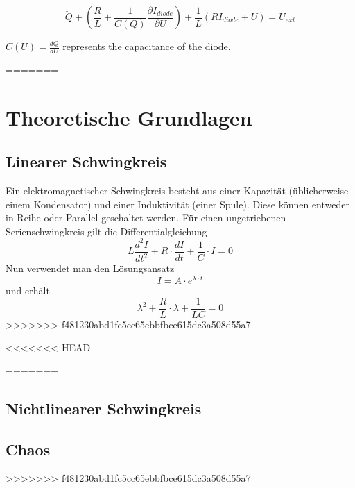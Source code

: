 \begin{equation} 
\ddot Q + \left(\frac{R}{L} + \frac{1}{C(Q)} \frac{\partial I_{diode}}{\partial U}\right) + \frac{1}{L}(RI_{diode}+U)=U_{ext} \end{equation}

$C(U) = \frac{dQ}{dU}$ represents the capacitance of the diode.


=======
\section{Theoretische Grundlagen}

\subsection{Linearer Schwingkreis}
Ein elektromagnetischer Schwingkreis besteht aus einer Kapazität (üblicherweise einem Kondensator) und einer Induktivität (einer Spule). Diese können entweder in Reihe oder Parallel geschaltet werden. Für einen ungetriebenen Serienschwingkreis gilt die Differentialgleichung
\begin{equation}
 L \frac{d^2 I}{d t^2} + R \cdot \frac{d I}{d t} + \frac{1}{C} \cdot I = 0
\end{equation}
Nun verwendet man den Lösungsansatz
\begin{equation}
 I = A \cdot e^{\lambda \cdot t}
\end{equation}
und erhält
\begin{equation}
 \lambda^2 + \frac{R}{L} \cdot \lambda + \frac{1}{LC} = 0
\end{equation}
>>>>>>> f481230abd1fc5cc65ebbfbce615dc3a508d55a7





<<<<<<< HEAD

=======
\subsection{Nichtlinearer Schwingkreis}

\subsection{Chaos}
>>>>>>> f481230abd1fc5cc65ebbfbce615dc3a508d55a7
